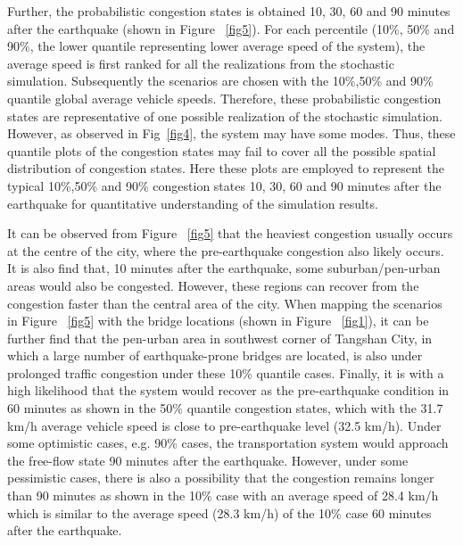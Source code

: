 \documentclass[review,11pt,nonatbib]{elsarticle}
\begin{document}
\par Further, the probabilistic congestion states is obtained 10, 30, 60 and 90 minutes after the earthquake (shown in Figure ~\ref{fig5}). For each percentile (10\%, 50\% and 90\%, the lower quantile representing lower average speed of the system), the average speed is first ranked for all the realizations from the stochastic simulation. Subsequently the scenarios are chosen with the 10\%,50\% and 90\% quantile global average vehicle speeds. Therefore, these probabilistic congestion states are representative of one possible realization of the stochastic simulation. However, as observed in Fig~\ref{fig4}, the system may have some modes. Thus, these quantile plots of the congestion states may fail to cover all the possible spatial distribution of congestion states. Here these plots are employed to represent the typical 10\%,50\% and 90\% congestion states 10, 30, 60 and 90 minutes after the earthquake for quantitative understanding of the simulation results. 

\par It can be observed from Figure ~\ref{fig5} that the heaviest congestion usually occurs at the centre of the city, where the pre-earthquake congestion also likely occurs.  It is also find that, 10 minutes after the earthquake, some suburban/pen-urban areas would also be congested. However, these regions can recover from the congestion faster than the central area of the city. When mapping the scenarios in Figure ~\ref{fig5} with the bridge locations (shown in Figure ~\ref{fig1}), it can be further find that the pen-urban area in southwest corner of Tangshan City, in which a large number of earthquake-prone bridges are located, is also under prolonged traffic congestion under these 10\% quantile cases. Finally, it is with a high likelihood that the system would recover as the pre-earthquake condition in 60 minutes as shown in the 50\% quantile congestion states, which with the 31.7 km/h average vehicle speed is close to pre-earthquake level (32.5 km/h). Under some optimistic cases, e.g. 90\% cases, the transportation system would  approach the free-flow state 90 minutes after the earthquake. However, under some pessimistic cases, there is also a possibility that the congestion remains longer than 90 minutes as shown in the 10\% case with an average speed of 28.4 km/h which is similar to the average speed (28.3 km/h) of the 10\% case 60 minutes after the earthquake.  
\end{document}
